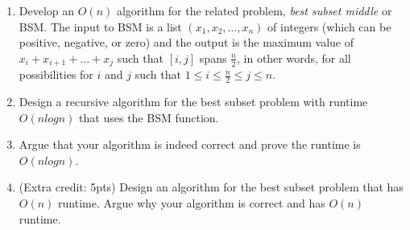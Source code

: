\documentclass[12pt,letterpaper]{article}
\begin{document}
\begin{enumerate}
    \item{Develop an $O(n)$ algorithm for the related problem, \textit{best subset middle} or BSM. The input to BSM is a list $(x_1, x_2, \ldots , x_n)$ of integers (which can be positive, negative, or zero) and the output is the maximum value of $x_i + x_{i+1} + \ldots + x_j$ such that $[i, j]$ spans $\frac{n}{2}$, in other words, for all possibilities for $i$ and $j$ such that $1 \leq i \leq \frac{n}{2} \leq j \leq n.$}
    \item{Design a recursive algorithm for the best subset problem with runtime $O(n log n)$ that
    uses the BSM function.}
    \item{Argue that your algorithm is indeed correct and prove the runtime is $O(n log n).$}
    \item{ (Extra credit: 5pts) Design an algorithm for the best subset problem that has $O(n)$
    runtime. Argue why your algorithm is correct and has $O(n)$ runtime.}
\end{enumerate}
\end{document}
